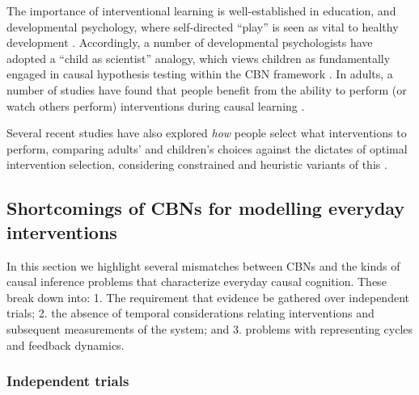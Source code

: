 \documentclass{cambridge7A}%
\begin{document}
The importance of interventional learning is well-established in education, and developmental psychology, where self-directed ``play'' is seen as vital to healthy development \citep[e.g.][]{piaget1930child, bruner1976play}.  Accordingly, a number of developmental psychologists have adopted a ``child as scientist'' analogy, which views children as fundamentally engaged in causal hypothesis testing within the CBN framework \citep{gopnik2000detecting,gopnik2004maps,sobel2006importance,mccormack2016children}.  In adults, a number of studies have found that people benefit from the ability to perform (or watch others perform) interventions during causal learning \citep{lagnado2002learning, lagnado2006time, lagnado2004advantage, schulz2001do, sobel2006importance}. 

Several recent studies have also explored \emph{how} people select what interventions to perform, comparing adults' and children's choices against the dictates of optimal intervention selection,  considering constrained and heuristic variants of this \citep{bramley2015fcs,bramley2017neurath,mccormack2016children,coenen2015strategies,steyvers2003intervention}.

\subsection{Shortcomings of CBNs for modelling everyday interventions}

In this section we highlight several mismatches between CBNs and the kinds of causal inference problems that characterize everyday causal cognition.  These break down into: 1. The requirement that evidence be gathered over independent trials; 2. the absence of temporal considerations relating interventions and subsequent measurements of the system; and 3. problems with representing cycles and feedback dynamics.

\subsubsection{Independent trials}
\end{document}
